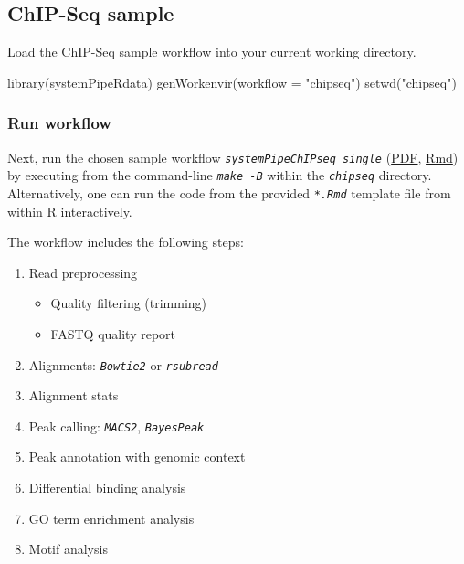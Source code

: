 \documentclass[14pt,]{article}
\providecommand{\tightlist}{%
  \setlength{\itemsep}{0pt}\setlength{\parskip}{0pt}}
\newcommand{\hlstr}[1]{\textcolor[rgb]{0.251,0.627,0.251}{#1}}%
\newcommand{\hlstd}[1]{\textcolor[rgb]{0.251,0.251,0.251}{#1}}%
\newenvironment{Shaded}{\begin{myshaded}}{\end{myshaded}}
\newcommand{\StringTok}[1]{\hlstr{#1}}
\newcommand{\FunctionTok}[1]{\hlstd{#1}}
\newcommand{\AttributeTok}[1]{{#1}}
\newcommand{\NormalTok}[1]{\hlstd{#1}}
\begin{document}
\hypertarget{chip-seq-sample}{%
\subsection{ChIP-Seq sample}\label{chip-seq-sample}}

Load the ChIP-Seq sample workflow into your current working directory.

\begin{Shaded}
\begin{Highlighting}[]
\FunctionTok{library}\NormalTok{(systemPipeRdata)}
\FunctionTok{genWorkenvir}\NormalTok{(}\AttributeTok{workflow =} \StringTok{"chipseq"}\NormalTok{)}
\FunctionTok{setwd}\NormalTok{(}\StringTok{"chipseq"}\NormalTok{)}
\end{Highlighting}
\end{Shaded}

\hypertarget{run-workflow-1}{%
\subsubsection{Run workflow}\label{run-workflow-1}}

Next, run the chosen sample workflow \emph{\texttt{systemPipeChIPseq\_single}} (\href{https://github.com/tgirke/systemPipeRdata/blob/master/inst/extdata/workflows/chipseq/systemPipeChIPseq.pdf?raw=true}{PDF}, \href{https://github.com/tgirke/systemPipeRdata/blob/master/inst/extdata/workflows/chipseq/systemPipeChIPseq.Rmd}{Rmd}) by executing from the command-line \emph{\texttt{make -B}} within the \emph{\texttt{chipseq}} directory. Alternatively, one can run the code from the provided \emph{\texttt{*.Rmd}} template file from within R interactively.

The workflow includes the following steps:

\begin{enumerate}
\def\labelenumi{\arabic{enumi}.}
\tightlist
\item
  Read preprocessing

  \begin{itemize}
  \tightlist
  \item
    Quality filtering (trimming)
  \item
    FASTQ quality report
  \end{itemize}
\item
  Alignments: \emph{\texttt{Bowtie2}} or \emph{\texttt{rsubread}}
\item
  Alignment stats
\item
  Peak calling: \emph{\texttt{MACS2}}, \emph{\texttt{BayesPeak}}
\item
  Peak annotation with genomic context
\item
  Differential binding analysis
\item
  GO term enrichment analysis
\item
  Motif analysis
\end{enumerate}
\end{document}
